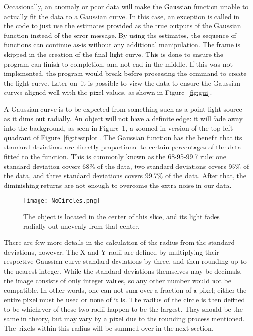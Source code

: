 Occasionally, an anomaly or poor data will make the Gaussian function unable to actually fit the data to a Gaussian curve. In this case, an exception is called in the code to just use the estimates provided as the true outputs of the Gaussian function instead of the error message. By using the estimates, the sequence of functions can continue as-is without any additional manipulation. The frame is skipped in the creation of the final light curve. This is done to ensure the program can finish to completion, and not end in the middle. If this was not implemented, the program would break before processing the command to create the light curve. Later on, it is possible to view the data to ensure the Gaussian curves aligned well with the pixel values, as shown in Figure~\ref{fig:gui}.

A Gaussian curve is to be expected from something such as a point light source as it dims out radially. An object will not have a definite edge: it will fade away into the background, as seen in Figure~\ref{fig:NoCircles}, a zoomed in version of the top left quadrant of Figure~\ref{fig:testplot}. The Gaussian function has the benefit that its standard deviations are directly proportional to certain percentages of the data fitted to the function. This is commonly known as the 68-95-99.7 rule: one standard deviation covers 68\% of the data, two standard deviations covers 95\% of the data, and three standard deviations covers 99.7\% of the data. After that, the diminishing returns are not enough to overcome the extra noise in our data.

\begin{figure}[ht!]
	\centering
	\texttt{[image: NoCircles.png]}
	\caption{The object is located in the center of this slice, and its light fades radially out unevenly from that center.}
	\label{fig:NoCircles}
\end{figure}

There are few more details in the calculation of the radius from the standard deviations, however. The X and Y radii are defined by multiplying their respective Gaussian curve standard deviations by three, and then rounding up to the nearest integer. While the standard deviations themselves may be decimals, the image consists of only integer values, so any other number would not be compatible. In other words, one can not sum over a fraction of a pixel; either the entire pixel must be used or none of it is. The radius of the circle is then defined to be whichever of these two radii happen to be the largest. They should be the same in theory, but may vary by a pixel due to the rounding process mentioned. The pixels within this radius will be summed over in the next section. 

